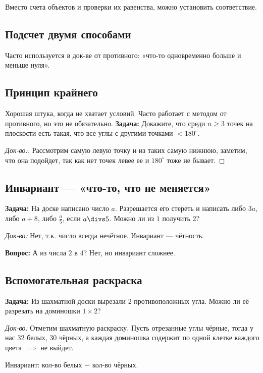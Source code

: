 \documentclass[10pt, a4paper]{article}
\begin{document}
Вместо счета объектов и проверки их равенства, можно установить соответствие.

\subsection*{Подсчет двумя способами}
Часто используется в док-ве от противного: «что-то одновременно больше и меньше нуля».

\subsection*{Принцип крайнего}

Хорошая штука, когда не хватает условий. Часто работает с методом от противного, но это не обязательно.
\noindent        
\textbf{Задача:} Докажите, что среди $n\ge 3$ точек на плоскости есть такая, что все углы с другими точками $<180^\circ$. 
\begin{proof}[Док-во:]
    Рассмотрим самую левую точку и из таких самую нижнюю, заметим, что она подойдет, так как нет точек левее ее и $180^\circ$ тоже не бывает. 
\end{proof}

\subsection*{Инвариант --- «что-то, что не меняется»}

\textbf{Задача:} На доске написано число $a$. Разрешается его стереть и написать либо $3a$, либо $a+8$, либо $\frac{a}{5}$, если $a \divs 5$. Можно ли из $1$ получить $2$?

\noindent \textit{Док-во:} Нет, т.к. число всегда нечётное. Инвариант --- чётность.

\noindent \textbf{Вопрос:} А из числа $2$ в $4$? Нет, но инвариант сложнее.

\subsection*{Вспомогательная раскраска}

\textbf{Задача:} Из шахматной доски вырезали 2 противоположных угла. Можно ли её разрезать на доминошки $1 \times 2$?

\noindent \textit{Док-во:} Отметим шахматную раскраску. Пусть отрезанные углы чёрные, тогда у нас 32 белых, 30 чёрных, а каждая доминошка содержит по одной клетке каждого цвета $\implies$ не выйдет.

\noindent Инвариант: кол-во белых $-\,\, \text{кол-во}$ чёрных.
\end{document}
